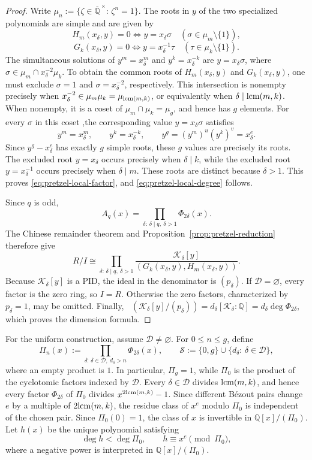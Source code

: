 \documentclass{article}
\theoremstyle{definition}
\theoremstyle{plain}
\newcommand{\Q}{{\mathbb{Q}}}
\newcommand{\lcm}{{\rm lcm}}
\DeclareMathOperator{\dimQ}{dim_{\Q}}
\begin{document}
\begin{proof}
Write \(\mu_n:=\{\zeta\in\overline{\Q}^{\,\times}:\,\zeta^n=1\}\).
The roots in \(y\) of the two specialized polynomials are simple and are
given by
\[
H_m(x_\delta,y)=0
\iff y=x_\delta\sigma
\quad(\sigma\in\mu_m\setminus\{1\}),
\]
\[
G_k(x_\delta,y)=0
\iff y=x_\delta^{-1}\tau
\quad(\tau\in\mu_k\setminus\{1\}).
\]
The simultaneous solutions of \(y^m=x_\delta^m\) and
\(y^k=x_\delta^{-k}\) are \(y=x_\delta\sigma\), where
\(\sigma\in\mu_m\cap x_\delta^{-2}\mu_k\).
To obtain the common roots of \(H_m(x_\delta,y)\) and
\(G_k(x_\delta,y)\), one must exclude
\(\sigma=1\) and \(\sigma=x_\delta^{-2}\), respectively.
This intersection is nonempty precisely when
\(x_\delta^{-2}\in\mu_m\mu_k=\mu_{\lcm(m,k)}\), or equivalently when
\(\delta\mid\lcm(m,k)\).  When nonempty, it is a
coset of \(\mu_m\cap\mu_k=\mu_g\), and hence has \(g\) elements.
For every \(\sigma\) in this coset ,the corresponding value \(y=x_\delta\sigma\) satisfies
\[
y^m=x_\delta^m,
\qquad
y^k=x_\delta^{-k},
\qquad
y^g=(y^m)^u(y^k)^v=x_\delta^e.
\]
Since \(y^g-x_\delta^e\) has exactly \(g\) simple roots, these \(g\)
values are precisely its roots.  The excluded root \(y=x_\delta\) occurs
precisely when \(\delta\mid k\), while the excluded root
\(y=x_\delta^{-1}\) occurs precisely when \(\delta\mid m\).  These roots
are distinct because \(\delta>1\).  This proves
\eqref{eq:pretzel-local-factor}, and
\eqref{eq:pretzel-local-degree} follows.

Since \(q\) is odd,
\[
A_q(x)=\prod_{\delta:\,\delta\mid q,\ \delta>1}\Phi_{2\delta}(x).
\]
The Chinese remainder theorem and
Proposition~\ref{prop:pretzel-reduction} therefore give
\[
R/I\cong
\prod_{\delta:\,\delta\mid q,\ \delta>1}
\frac{\mathcal K_\delta[y]}{(G_k(x_\delta,y),H_m(x_\delta,y))}.
\]
Because \(\mathcal K_\delta[y]\) is a PID, the ideal in the denominator
is \((p_\delta)\).  If \(\mathcal D=\varnothing\), every factor is the
zero ring, so \(I=R\).  Otherwise the zero factors, characterized by
\(p_\delta=1\), may be omitted.  Finally,
\(\dimQ(\mathcal K_\delta[y]/(p_\delta))
=d_\delta[\mathcal K_\delta:\Q]=d_\delta\deg\Phi_{2\delta}\), which
proves the dimension formula.
\end{proof}

For the uniform construction, assume \(\mathcal D\ne\varnothing\).  For
\(0\le n\le g\), define
\[
\Pi_n(x):=
\prod_{\delta:\,\delta\in\mathcal D,\ d_\delta>n}\Phi_{2\delta}(x),
\qquad
\mathcal S:=\{0,g\}\cup\{d_\delta:\,\delta\in\mathcal D\},
\]
where an empty product is \(1\).  In particular, \(\Pi_g=1\), while
\(\Pi_0\) is the product of the cyclotomic factors indexed by
\(\mathcal D\).  Every \(\delta\in\mathcal D\) divides
\(\lcm(m,k)\), and hence every factor \(\Phi_{2\delta}\) of \(\Pi_0\)
divides \(x^{2\lcm(m,k)}-1\).  Since different B\'ezout pairs change
\(e\) by a multiple of \(2\lcm(m,k)\), the residue class of \(x^e\)
modulo \(\Pi_0\) is independent of the chosen pair.  Since
\(\Pi_0(0)=1\), the class
of \(x\) is invertible in \(\Q[x]/(\Pi_0)\).  Let \(h(x)\) be the unique
polynomial satisfying
\[
\deg h<\deg\Pi_0,
\qquad
h\equiv x^e\pmod{\Pi_0},
\]
where a negative power is interpreted in \(\Q[x]/(\Pi_0)\).
\end{document}
